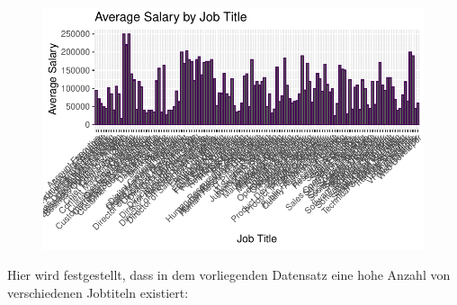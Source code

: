 \documentclass[
  letterpaper,
  DIV=11,
  numbers=noendperiod]{scrartcl}
\newenvironment{Shaded}{\begin{snugshade}}{\end{snugshade}}
\newcommand{\FunctionTok}[1]{\textcolor[rgb]{0.28,0.35,0.67}{#1}}
\newcommand{\NormalTok}[1]{\textcolor[rgb]{0.00,0.23,0.31}{#1}}
\newcommand{\OtherTok}[1]{\textcolor[rgb]{0.00,0.23,0.31}{#1}}
\newcommand{\SpecialCharTok}[1]{\textcolor[rgb]{0.37,0.37,0.37}{#1}}
\begin{document}
\begin{figure}[H]

{\centering \includegraphics{main_doc_files/figure-pdf/unnamed-chunk-35-1.pdf}

}

\end{figure}

Hier wird festgestellt, dass in dem vorliegenden Datensatz eine hohe
Anzahl von verschiedenen Jobtiteln existiert:

\begin{Shaded}
\end{Shaded}
\end{document}
